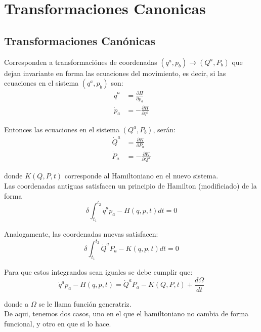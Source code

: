 \documentclass[12pt]{report}
\begin{document}
\chapter{Transformaciones Canonicas}



\section{Transformaciones Can\'onicas}

Corresponden a transformaci\'ones de coordenadas $(q^{a},p_{b}) \rightarrow (Q^{a},P_{b})$ que dejan invariante en 
forma las ecuaciones del movimiento, es decir, si las ecuaciones en el sistema $(q^{a},p_{b}) $ son:
	\begin{align*}
		\dot{q}^{a} &= \frac{\partial H}{\partial p_{a}} \\
		 \dot{p}_{a} &= -\frac{\partial H}{\partial q^{a}}
	\end{align*}

Entonces las ecuaciones en el sistema $(Q^{a},P_{b})$, ser\'an:
	\begin{align*}
		\dot{Q}^{a} &= \frac{\partial K}{\partial P_{a}} \\
	    \dot{P}_{a} &= -\frac{\partial K}{\partial Q^{a}}
	\end{align*}

donde $K(Q,P,t)$ corresponde al Hamiltoniano en el nuevo sistema.\\

Las coordenadas antiguas satisfacen un principio de Hamilton (modificiado) de la forma
	\begin{equation*}
		\delta\int^{t_{2}}_{t_{1}} \dot{q}^{a}p_{a} - H(q,p,t) dt = 0
	\end{equation*}
	
Analogamente, las coordenadas nuevas satisfacen:
	\begin{equation*}
		\delta\int^{t_{2}}_{t_{1}} \dot{Q}^{a}P_{a} - K(q,p,t) dt = 0
	\end{equation*}

Para que estos integrandos sean iguales se debe cumplir que:
	\begin{equation*}
		\dot{q}^{a}p_{a} - H(q,p,t) =  \dot{Q}^{a}P_{a} - K(Q,P,t)  + \frac{d\Omega}{dt}
	\end{equation*}

donde a $\Omega$ se le llama funci\'on generatriz.\\

De aqui, tenemos dos casos, uno en el que el hamiltoniano no cambia de forma funcional, y otro en que si lo hace.
\end{document}
